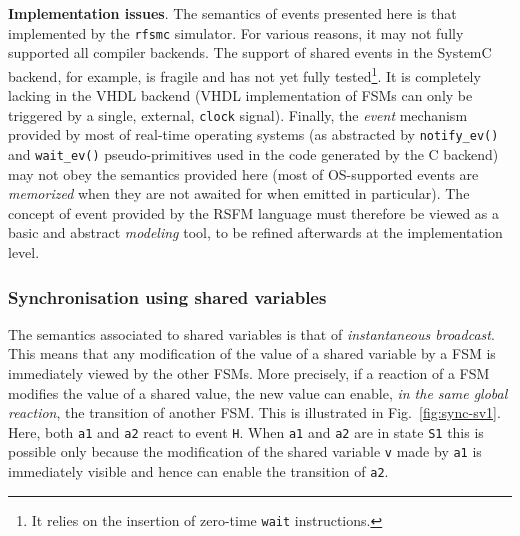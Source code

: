 \medskip \textbf{Implementation issues}.  The semantics of events presented here is that implemented
by the \texttt{rfsmc} simulator. For various reasons, it may not fully supported all compiler
backends.  The support of shared events in the SystemC backend, for example, is fragile and has not
yet fully tested\footnote{It relies on the insertion of zero-time \texttt{wait} instructions.}. It
is completely lacking in the VHDL backend (VHDL implementation of FSMs can only be triggered by a
single, external, \texttt{clock} signal).  Finally, the \emph{event} mechanism provided by most
of real-time operating systems (as abstracted by \verb|notify_ev()| and \verb|wait_ev()|
pseudo-primitives used in the code generated by the C backend) may not obey the semantics provided
here (most of OS-supported events are \emph{memorized} when they are not awaited for when emitted in
particular). The concept of event provided by the RSFM language must therefore be viewed as a basic
and abstract \emph{modeling} tool, to be refined afterwards at the implementation level.

\subsubsection*{Synchronisation using shared variables}

The semantics associated to shared variables is that
of \emph{instantaneous broadcast}. This means that any modification of the value of a shared variable by a
FSM is immediately viewed by the other FSMs. More precisely, if a reaction of a FSM modifies the
value of a shared value, the new value can enable, \emph{in the same global reaction}, the
transition of another FSM. This is illustrated in Fig.~\ref{fig:sync-sv1}. Here, both \texttt{a1}
and \texttt{a2} react to event \texttt{H}. When \texttt{a1} and \texttt{a2} are in state \texttt{S1} this is possible
only because the modification of the shared variable \texttt{v} made by \texttt{a1} is immediately
visible and hence can enable the transition of \texttt{a2}.


